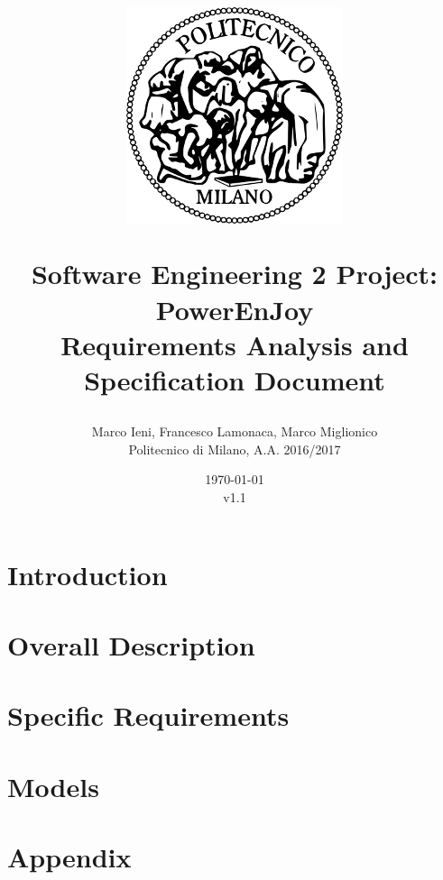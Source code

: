 \documentclass[a4paper, 12pt]{report}
\title{
	\begin{figure}[h]
		\centering
		\includegraphics{../common_resources/logo_polimi.png}
	\end{figure}
	\vspace{30px}
	Software Engineering 2 Project: PowerEnJoy \\ \vspace{1em}
	\textbf{R}equirements \textbf{A}nalysis and \textbf{S}pecification \textbf{D}ocument
}
\author{Marco Ieni, Francesco Lamonaca, Marco Miglionico\\Politecnico di Milano, A.A. 2016/2017}
\date{\today\\v1.1}
\begin{document}
\maketitle
\tableofcontents

\chapter{Introduction}
\label{ch:introduction}





% 
% 

\chapter{Overall Description}
\label{ch:overall_description}







\chapter{Specific Requirements}
\label{ch:specific_requirements}


% 



\chapter{Models}
\label{ch:models}






\appendix
\chapter{Appendix}

\end{document}
